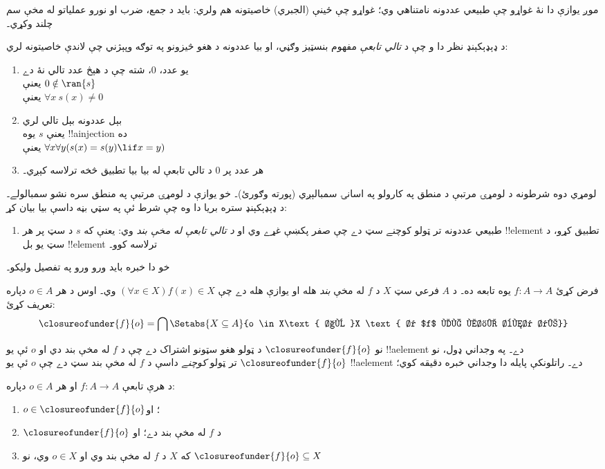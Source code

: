 \documentclass[../../../include/open-logic-section]{subfiles}
\begin{document}

موږ يوازې دا نۀ غواړو چې طبيعي عددونه نامتناهي وي؛ غواړو چې ځينې
(الجبري) خاصيتونه هم ولري: بايد د جمع، ضرب او نورو عملياتو له مخې
سم چلند وکړي۔

د ډېډېکېنډ نظر دا و چې د \emph{تالي تابعې} مفهوم بنسټيز وګڼي، او
بيا عددونه د هغو څيزونو په توګه وپېژني چې لاندې خاصيتونه لري:
\begin{enumerate}
	\item يو عدد، $0$، شته چې د هېڅ عدد تالي نۀ دے
	\\يعنې $0 \notin \ran{s}$
	\\يعنې $\forall x\ s(x) \neq 0$
	\item بېل عددونه بېل تالي لري
	\\يعنې $s$ يوه !!a{injection} ده
	\\يعنې $\forall x \forall y (s(x) = s(y) \lif x = y)$
	\item{} هر عدد پر $0$ د تالي تابعې له
	بيا بيا تطبيق څخه ترلاسه کېږي۔
\end{enumerate}
لومړي دوه شرطونه د لومړۍ مرتبې د منطق په کارولو په اسانۍ سمبالېږي
(پورته وګورئ)۔ خو يوازې د لومړۍ مرتبې په منطق سره
 نشو سمبالولے۔ د ډېډېکېنډ ستره بريا دا وه
چې شرط  ئې په سټي بڼه داسې بيا بيان کړ:
\begin{enumerate}
	\item[3$'$.] طبيعي عددونه تر ټولو کوچنے سټ دے چې صفر پکښې غړے وي او
	\emph{د تالي تابعې له مخې بند} وي: يعنې که $s$ د سټ پر هر !!{element} تطبيق
	کړو، د سټ يو بل !!{element} ترلاسه کوو۔
\end{enumerate}
خو دا خبره بايد ورو ورو په تفصيل وليکو۔

\begin{defn}
	فرض کړئ $f\colon A\to A$ يوه تابعه ده۔ د $A$ فرعي سټ
	$X$ د $f$ له مخې \emph{بند} هله او يوازې هله دے چې
	$(\forall x \in X)f(x) \in X$ وي۔ اوس د هر $o\in A$ دپاره تعريف کړئ:
	$$\closureofunder{f}{o} = \bigcap\Setabs{X\subseteq A}{o \in X\text{ او }X
\text{ د $f$ له مخې بند دے}}$$
\end{defn}

نو $\closureofunder{f}{o}$ د ټولو هغو سټونو اشتراک دے چې د $f$ له
مخې بند دي او $o$ ئې يو !!a{element} دے۔ په وجداني ډول، نو
$\closureofunder{f}{o}$ تر ټولو \emph{کوچنے} داسې د $f$ له مخې بند
سټ دے چې $o$ ئې يو !!a{element} دے۔ راتلونکې پايله دا وجداني خبره
دقيقه کوي؛
\begin{lem}
	د هرې تابعې $f\colon A\to A$ او هر $o \in A$ دپاره:
	\begin{enumerate}
		\item{} $o \in \closureofunder{f}{o}$؛ او
		\item{} $\closureofunder{f}{o}$ د $f$ له مخې بند دے؛ او
		\item{} که $X$ د $f$ له مخې بند وي او $o \in
		X$ وي، نو $\closureofunder{f}{o} \subseteq X$
	\end{enumerate}
\end{lem}
\end{document}
